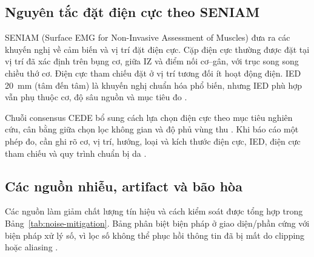 \subsection{Nguyên tắc đặt điện cực theo SENIAM}
\label{sec:seniam}

SENIAM (Surface EMG for Non-Invasive Assessment of Muscles) đưa ra các
khuyến nghị về cảm biến và vị trí đặt điện cực. Cặp điện cực thường được
đặt tại vị trí đã xác định trên bụng cơ, giữa IZ và điểm nối cơ--gân, với
trục song song chiều thớ cơ. Điện cực tham chiếu đặt ở vị trí tương đối
ít hoạt động điện. IED 20~mm (tâm đến tâm) là khuyến nghị chuẩn hóa phổ
biến, nhưng IED phù hợp vẫn phụ thuộc cơ, độ sâu nguồn và mục tiêu đo
\cite{hermens2000development,campanini2022fundamental}.

Chuỗi consensus CEDE bổ sung cách lựa chọn điện cực theo mục tiêu nghiên
cứu, cân bằng giữa chọn lọc không gian và độ phủ vùng thu
\cite{besomi2019consensus}. Khi báo cáo một phép đo, cần ghi rõ cơ, vị trí,
hướng, loại và kích thước điện cực, IED, điện cực tham chiếu và quy trình
chuẩn bị da \cite{merletti1999standards,besomi2024cede}.

\subsection{Các nguồn nhiễu, artifact và bão hòa}
\label{sec:noise-artifacts}

Các nguồn làm giảm chất lượng tín hiệu và cách kiểm soát được tổng hợp
trong Bảng~\ref{tab:noise-mitigation}. Bảng phân biệt biện pháp ở giao
diện/phần cứng với biện pháp xử lý số, vì lọc số không thể phục hồi thông
tin đã bị mất do clipping hoặc aliasing
\cite{boyer2023reducing,deluca2010filtering}.

